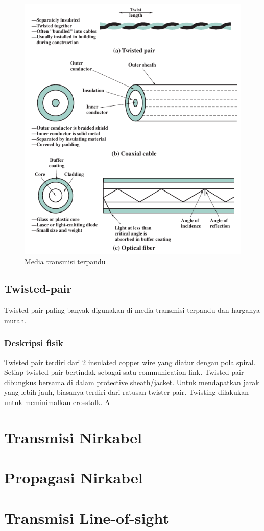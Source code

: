 \begin{figure}
	\centering
	\includegraphics[width=\linewidth]{gambar/4.1.gambar.4.2.media_terpandu}
	\caption{Media transmisi terpandu}
	\label{fig:4.media.terpandu}
\end{figure}

\subsection{Twisted-pair}

Twisted-pair paling banyak digunakan di media transmisi terpandu dan harganya murah.

\subsubsection{Deskripsi fisik}

Twisted pair terdiri dari 2 insulated copper wire yang diatur dengan pola spiral. Setiap twisted-pair bertindak sebagai satu communication link. Twisted-pair dibungkus bersama di dalam protective sheath/jacket. Untuk mendapatkan jarak yang lebih jauh, biasanya terdiri dari ratusan twister-pair. Twisting dilakukan untuk meminimalkan crosstalk. A

\section{Transmisi Nirkabel}

\section{Propagasi Nirkabel}

\section{Transmisi Line-of-sight}

